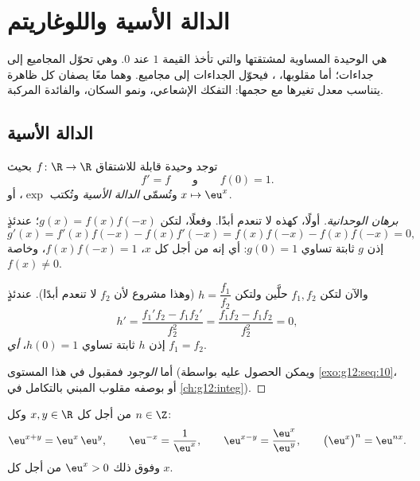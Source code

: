 \chapter{الدالة الأسية واللوغاريتم}\label{ch:g12:exp}

 هي  الوحيدة المساوية لمشتقتها
والتي تأخذ القيمة $1$ عند $0$. وهي تحوّل المجاميع إلى جداءات؛ أما مقلوبها،
، فيحوّل الجداءات إلى مجاميع. وهما معًا يصفان
كل ظاهرة يتناسب معدل تغيرها مع حجمها:
التفكك الإشعاعي، ونمو السكان، والفائدة المركبة.

\section{الدالة الأسية}

\begin{theorem}\label{thm:g12:exp:existence}
توجد  وحيدة قابلة للاشتقاق $f \colon \R \to \R$ بحيث
\[
f' = f \qquad\text{و}\qquad f(0) = 1 .
\]
وتُسمّى \emph{الدالة الأسية} وتُكتب
$\exp$، أو $x \mapsto \eu^x$.
\end{theorem}

\begin{proof}[برهان الوحدانية]
أولًا،  كهذه لا تنعدم أبدًا. وفعلًا، لتكن
$g(x) = f(x)f(-x)$؛ عندئذٍ
\[
g'(x) = f'(x)f(-x) - f(x)f'(-x) = f(x)f(-x) - f(x)f(-x) = 0,
\]
إذن $g$ ثابتة تساوي $g(0) = 1$: أي إنه من أجل كل $x$،
$f(x)f(-x) = 1$، وخاصة $f(x) \neq 0$.

والآن لتكن $f_1, f_2$ حلَّين ولتكن $h = \dfrac{f_1}{f_2}$ (وهذا مشروع
لأن $f_2$ لا تنعدم أبدًا). عندئذٍ
\[
h' = \frac{f_1' f_2 - f_1 f_2'}{f_2^2} = \frac{f_1 f_2 - f_1 f_2}{f_2^2} = 0,
\]
إذن $h$ ثابتة تساوي $h(0) = 1$، \emph{أي} $f_1 = f_2$.

أما \emph{الوجود} فمقبول في هذا المستوى (ويمكن الحصول عليه بواسطة
 \cref{exo:g12:seq:10}، أو بوصفه مقلوب 
المبني بالتكامل في \cref{ch:g12:integ}).
\end{proof}

\begin{proposition}\label{prop:g12:exp:funceq}
من أجل كل $x, y \in \R$ وكل $n \in \Z$:
\[
\eu^{x+y} = \eu^x\,\eu^y, \qquad
\eu^{-x} = \frac{1}{\eu^x}, \qquad
\eu^{x-y} = \frac{\eu^x}{\eu^y}, \qquad
\bigl(\eu^{x}\bigr)^n = \eu^{nx}.
\]
وفوق ذلك $\eu^x > 0$ من أجل كل $x$.
\end{proposition}

